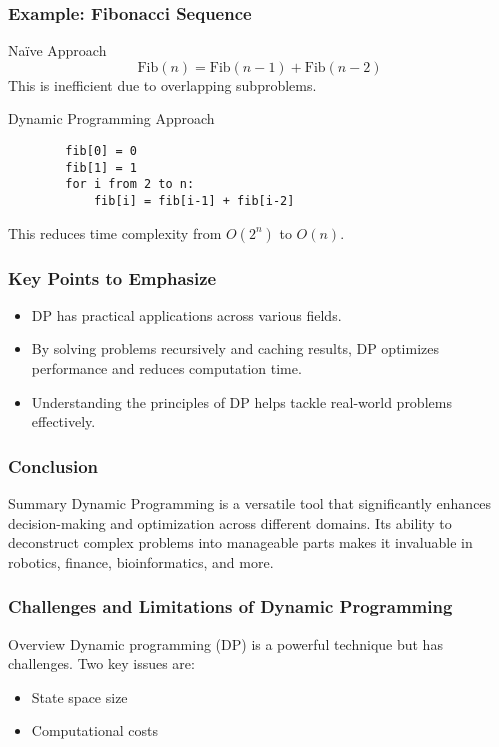 \documentclass[aspectratio=169]{beamer}
\begin{document}
\begin{frame}[fragile]
    \frametitle{Example: Fibonacci Sequence}
    \begin{block}{Naïve Approach}
        \begin{equation}
            \text{Fib}(n) = \text{Fib}(n-1) + \text{Fib}(n-2)
        \end{equation}
        This is inefficient due to overlapping subproblems.
    \end{block}
    \begin{block}{Dynamic Programming Approach}
        \begin{lstlisting}
        fib[0] = 0
        fib[1] = 1
        for i from 2 to n:
            fib[i] = fib[i-1] + fib[i-2]
        \end{lstlisting}
        This reduces time complexity from $O(2^n)$ to $O(n)$.
    \end{block}
\end{frame}

\begin{frame}[fragile]
    \frametitle{Key Points to Emphasize}
    \begin{itemize}
        \item DP has practical applications across various fields.
        \item By solving problems recursively and caching results, DP optimizes performance and reduces computation time.
        \item Understanding the principles of DP helps tackle real-world problems effectively.
    \end{itemize}
\end{frame}

\begin{frame}[fragile]
    \frametitle{Conclusion}
    \begin{block}{Summary}
        Dynamic Programming is a versatile tool that significantly enhances decision-making and optimization across different domains. 
        Its ability to deconstruct complex problems into manageable parts makes it invaluable in robotics, finance, bioinformatics, and more.
    \end{block}
\end{frame}

\begin{frame}[fragile]
    \frametitle{Challenges and Limitations of Dynamic Programming}
    \begin{block}{Overview}
        Dynamic programming (DP) is a powerful technique but has challenges. Two key issues are:
        \begin{itemize}
            \item State space size
            \item Computational costs
        \end{itemize}
    \end{block}
\end{frame}
\end{document}
